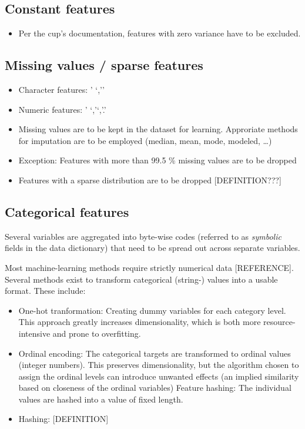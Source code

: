 \documentclass[
  11pt,
  a4paper,
  DIV=12,captions=tableheading,oneside]{scrbook}
\providecommand{\tightlist}{%
  \setlength{\itemsep}{0pt}\setlength{\parskip}{0pt}}
\providecommand{\tightlist}{%
  \setlength{\itemsep}{0pt}\setlength{\parskip}{0pt}}
\begin{document}
\hypertarget{constant-features}{%
\subsection{Constant features}\label{constant-features}}

\begin{itemize}
\tightlist
\item
  Per the cup's documentation, features with zero variance have to be excluded.
\end{itemize}

\hypertarget{missing-values-sparse-features}{%
\subsection{Missing values / sparse features}\label{missing-values-sparse-features}}

\begin{itemize}
\tightlist
\item
  Character features: ' `,''
\item
  Numeric features: ' `,'`,'.'
\item
  Missing values are to be kept in the dataset for learning. Approriate methods for imputation are to be employed (median, mean, mode, modeled, \ldots{})
\item
  Exception: Features with more than 99.5 \% missing values are to be dropped
\item
  Features with a sparse distribution are to be dropped {[}DEFINITION???{]}
\end{itemize}

\hypertarget{categorical-features}{%
\subsection{Categorical features}\label{categorical-features}}

Several variables are aggregated into byte-wise codes (referred to as \emph{symbolic} fields in the data dictionary) that need to be spread out across separate variables.

Most machine-learning methods require strictly numerical data {[}REFERENCE{]}. Several methods exist to transform categorical (string-) values into a usable format. These include:

\begin{itemize}
\tightlist
\item
  One-hot tranformation: Creating dummy variables for each category level.
  This approach greatly increases dimensionality, which is both more resource-intensive and prone to overfitting.
\item
  Ordinal encoding: The categorical targets are transformed to ordinal values (integer numbers). This preserves dimensionality, but the algorithm chosen to assign the ordinal levels can introduce unwanted effects (an implied similarity based on closeness of the ordinal variables)
  Feature hashing: The individual values are hashed into a value of fixed length.
\item
  Hashing: {[}DEFINITION{]}
\end{itemize}
\end{document}

